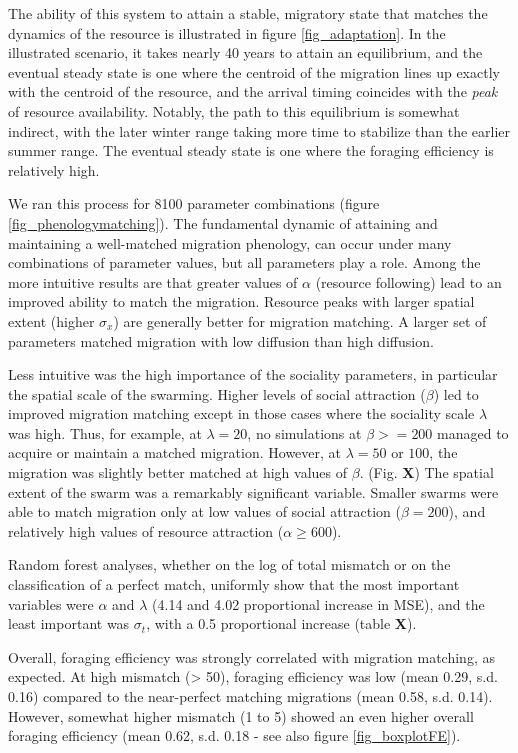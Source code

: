 \documentclass[12pt]{article}
\begin{document}
The ability of this system to attain a stable, migratory state that matches the dynamics of the resource is illustrated in figure \ref{fig_adaptation}. In the illustrated scenario, it takes nearly 40 years to attain an equilibrium, and the eventual steady state is one where the centroid of the migration lines up exactly with the centroid of the resource, and the arrival timing coincides with the \emph{peak} of resource availability. Notably, the path to this equilibrium is somewhat indirect, with the later winter range taking more time to stabilize than the earlier summer range. The eventual steady state is one where the foraging efficiency is relatively high.

We ran this process for 8100 parameter combinations (figure \ref{fig_phenologymatching}). The fundamental dynamic of attaining and maintaining a well-matched migration phenology, can occur under many combinations of parameter values, but all parameters play a role. Among the more intuitive results are that greater values of $\alpha$ (resource following) lead to an improved ability to match the migration. Resource peaks with larger spatial extent (higher $\sigma_x$) are generally better for migration matching. A larger set of parameters matched migration with low diffusion than high diffusion.

Less intuitive was the high importance of the sociality parameters, in particular the spatial scale of the swarming. Higher levels of social attraction ($\beta$) led to improved migration matching except in those cases where the sociality scale $\lambda$ was high. Thus, for example, at $\lambda = 20$, no simulations at $\beta >= 200$ managed to acquire or maintain a matched migration. However, at $\lambda = 50$ or $100$, the migration was slightly better matched at high values of $\beta$. (Fig. \textbf{X}) The spatial extent of the swarm was a remarkably significant variable. Smaller swarms were able to match migration only at low values of social attraction ($\beta = 200$), and relatively high values of resource attraction ($\alpha \geq 600$).

Random forest analyses, whether on the log of total mismatch or on the classification of a perfect match, uniformly show that the most important variables \citep{Breiman2001} were $\alpha$ and $\lambda$ (4.14 and 4.02 proportional increase in MSE), and the least important was $\sigma_t$, with a 0.5 proportional increase (table \textbf{X}).

Overall, foraging efficiency was strongly correlated with migration matching, as expected. At high mismatch (\textgreater{} 50), foraging efficiency was low (mean 0.29, s.d. 0.16) compared to the near-perfect matching migrations (mean 0.58, s.d. 0.14). However, somewhat higher mismatch (1 to 5) showed an even higher overall foraging efficiency (mean 0.62, s.d. 0.18 - see also figure \ref{fig_boxplotFE}).
\end{document}

